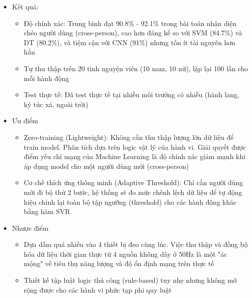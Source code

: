 \documentclass[../DoAn.tex]{subfiles}
\begin{document}
\begin{enumerate}[label=\arabic*)]
\begin{itemize}
\begin{itemize}
            \item Ước lượng tài nguyên: Cần bộ nhớ cực thấp so với mạng CNN (thể hiện qua biểu đồ thời gian và số lượng mẫu)
            \item Real-time & Low Power: Hệ thống xử lý thời gian thực. Nhóm tác giả thừa nhận việc bật IMU và Bluetooth/Wi-Fi liên tục gây tốn pin nghiêm trọng, và đề xuất dùng cơ chế ngắt (polling/triggering) cho tương lai. Trạm biên (Edge) hiện tại đang là PC.
        \end{itemize}
        \item Kết quả:
        \begin{itemize}
            \item Độ chính xác: Trung bình đạt 90.8\% - 92.1\% trong bài toán nhận diện chéo người dùng (cross-person), cao hơn đáng kể so với SVM (84.7\%) và DT (80.2\%), và tiệm cận với CNN (91\%) nhưng tốn ít tài nguyên hơn hẳn
            \item Tự thu thập trên 20 tình nguyện viên (10 nam, 10 nữ), lặp lại 100 lần cho mỗi hành động
            \item Test thực tế: Đã test thực tế tại nhiều môi trường có nhiễu (hành lang, ký túc xá, ngoài trời)
        \end{itemize}
        \item Ưu điểm
        \begin{itemize}
            \item Zero-training (Lightweight): Không cần thu thập lượng lớn dữ liệu để train model. Phân tích dựa trên logic vật lý của hành vi. Giải quyết được điểm yếu chí mạng của Machine Learning là độ chính xác giảm mạnh khi áp dụng model cho một người dùng mới (cross-person)
            \item Cơ chế thích ứng thông minh (Adaptive Threshold): Chỉ cần người dùng mới đi bộ thử 2 bước, hệ thống sẽ đo mức chênh lệch dữ liệu để tự động hiệu chỉnh lại toàn bộ tập ngưỡng (threshold) cho các hành động khác bằng hàm SVR
        \end{itemize}
        \item Nhược điểm
        \begin{itemize}
            \item Dựa dẫm quá nhiều vào 4 thiết bị đeo cùng lúc. Việc thu thập và đồng bộ hóa dữ liệu thời gian thực từ 4 nguồn không dây ở 50Hz là một "ác mộng" về tiêu thụ năng lượng và độ ổn định mạng trên thực tế
            \item Thiết kế tập luật logic thủ công (rule-based) tuy nhẹ nhưng không mở rộng được cho các hành vi phức tạp phi quy luật

\end{itemize}
\end{itemize}
\end{enumerate}
\end{document}
